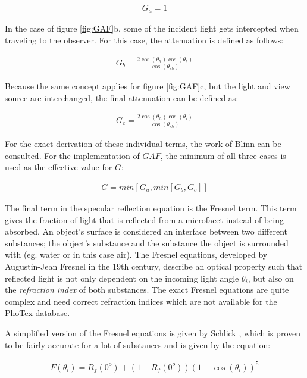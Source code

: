 	\begin{eqnarray*}
		G_a = 1
	\end{eqnarray*}

In the case of figure \ref{fig:GAF}b, some of the incident light gets intercepted when traveling to the observer. For this case, the attenuation is defined as follows:

	\begin{eqnarray*}
		G_b = \frac{2\cos(\theta_h)\cos(\theta_r)}{\cos(\theta_{rh})}
	\end{eqnarray*}

\noindent Because the same concept applies for figure \ref{fig:GAF}c, but the light and view source are interchanged, the final attenuation can be defined as:

	\begin{eqnarray*}
		G_c = \frac{2\cos(\theta_h)\cos(\theta_i)}{\cos(\theta_{rh})}
	\end{eqnarray*}

\noindent For the exact derivation of these individual terms, the work of Blinn \cite{Blinn} can be consulted. For the implementation of $GAF$, the minimum of all three cases is used as the effective value for $G$:

	\begin{eqnarray*}
		G = min \left[ {G_a, min \left[ {G_b, G_c} \right] } \right]
	\end{eqnarray*}

\noindent The final term in the specular reflection equation is the Fresnel term. This term gives the fraction of light that is reflected from a microfacet instead of being absorbed. An object's surface is considered an interface between two different substances; the object's substance and the substance the object is surrounded with (eg. water or in this case air). The Fresnel equations, developed by Augustin-Jean Fresnel in the 19th century, describe an optical property such that reflected light is not only dependent on the incoming light angle $\theta_i$, but also on the \textit{refraction index} of both substances. The exact Fresnel equations are quite complex and need correct refraction indices which are not available for the PhoTex database. 

A simplified version of the Fresnel equations is given by Schlick \cite{Schlick}, which is proven to be fairly accurate for a lot of substances and is given by the equation:

	\begin{eqnarray*}
		F(\theta_i) = R_f(0^o) + (1 - R_f(0^o))(1 - \cos(\theta_i))^5
	\end{eqnarray*}

